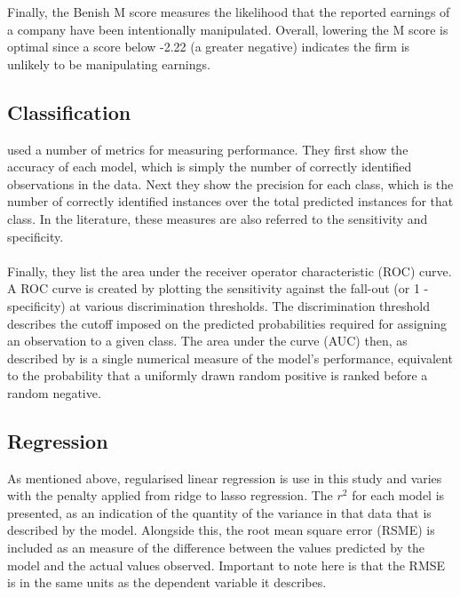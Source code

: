 {{%
Finally, the Benish M score measures the likelihood that the reported earnings of a company have been intentionally manipulated. Overall, lowering the M score is optimal since a score below -2.22 (a greater negative) indicates the firm is unlikely to be manipulating earnings.  
   }
\subsection{Classification}
\cite{moldovan2015learning} used a number of metrics for measuring performance. They first show the accuracy of each model, which is simply the number of correctly identified observations in the data. Next they show the precision for each class, which is the number of correctly identified instances over the total predicted instances for that class. In the literature, these measures are also referred to the sensitivity and specificity. \\\\ Finally, they list the area under the receiver operator characteristic (ROC) curve. A ROC curve is created by plotting the sensitivity against the fall-out (or 1 - specificity) at various discrimination thresholds. The discrimination threshold describes the cutoff imposed on the predicted probabilities required for assigning an observation to a given class. The area under the curve (AUC) then, as described by \cite{flachAUC} is a single numerical measure of the model's performance, equivalent to the probability that a uniformly drawn random positive is ranked before a random negative. 
\subsection{Regression}
{As mentioned above, regularised linear regression is use in this study and varies with the penalty applied from ridge to lasso regression. The $r^2$ for each model is presented, as an indication of the quantity of the variance in that data that is described by the model. Alongside this, the root mean square error (RSME) is included as an measure of the difference between the values predicted by the model and the actual values observed.  Important to note here is that the RMSE is in the same units as the dependent variable it describes.  }
}
